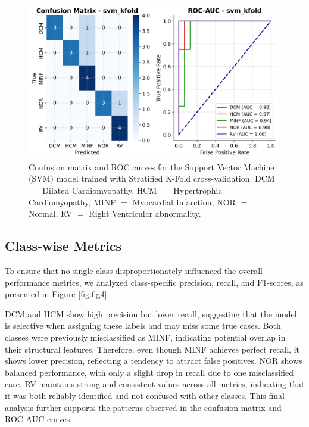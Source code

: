 \begin{figure}[H]
	\begin{center}
		\includegraphics[width=0.99\textwidth]{../images/metrics/svm/svm_kfold_metrics.png}
	\end{center}
	\caption{Confusion matrix and ROC curves for the Support Vector Machine (SVM)
		model trained with Stratified K-Fold cross-validation. DCM $=$ Dilated
		Cardiomyopathy, HCM $=$ Hypertrophic Cardiomyopathy, MINF $=$ Myocardial
		Infarction, NOR $=$ Normal, RV $=$ Right Ventricular abnormality.}
	\label{fig:fig3}
\end{figure}

\subsection{Class-wise Metrics}

To ensure that no single class disproportionately influenced the overall
performance metrics, we analyzed class-specific precision, recall, and
F1-scores, as presented in Figure \ref{fig:fig4}.

DCM and HCM show high precision but lower recall, suggesting that the model is
selective when assigning these labels and may miss some true cases. Both
classes were previously misclassified as MINF, indicating potential overlap in
their structural features. Therefore, even though MINF achieves perfect recall,
it shows lower precision, reflecting a tendency to attract false positives. NOR
shows balanced performance, with only a slight drop in recall due to one
misclassified case. RV maintains strong and consistent values across all
metrics, indicating that it was both reliably identified and not confused with
other classes. This final analysis further supports the patterns observed in
the confusion matrix and ROC-AUC curves.

